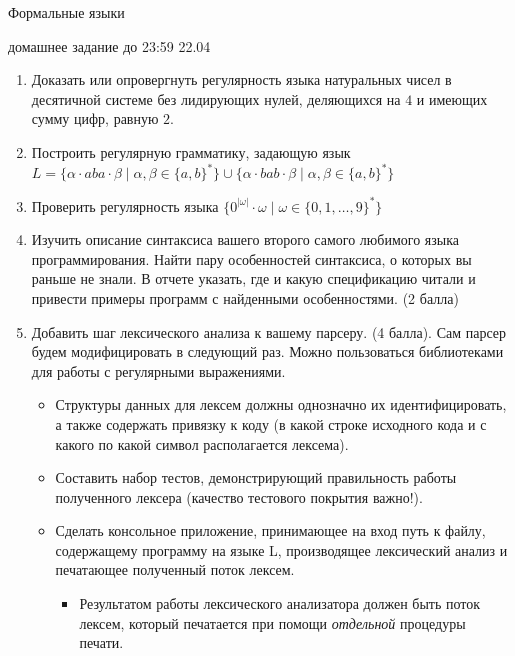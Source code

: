 \documentclass{article}
\begin{document}
\begin{center} {\LARGE Формальные языки} \end{center}

\begin{center} {\Large домашнее задание до 23:59 22.04} \end{center}
\bigskip

\begin{enumerate}
  \item Доказать или опровергнуть регулярность языка натуральных чисел в десятичной системе без лидирующих нулей, деляющихся на $4$ и имеющих сумму цифр, равную $2$.
  \item Построить регулярную грамматику, задающую язык \\ $ L = \{ \alpha \cdot a b a \cdot \beta \mid \alpha, \beta \in \{ a, b \}^* \} \cup \{ \alpha \cdot b a b \cdot \beta \mid \alpha, \beta \in \{ a, b \}^* \} $
  \item Проверить регулярность языка $\{ 0^{|\omega|} \cdot \omega \mid \omega \in \{ 0, 1, \dots, 9 \}^* \} $
  \item Изучить описание синтаксиса вашего второго самого любимого языка программирования. Найти пару особенностей синтаксиса, о которых вы раньше не знали. В отчете указать, где и какую спецификацию читали и привести примеры программ с найденными особенностями. (2 балла)
  \item Добавить шаг лексического анализа к вашему парсеру. (4 балла). Сам парсер будем модифицировать в следующий раз. Можно пользоваться библиотеками для работы с регулярными выражениями. 
    \begin{itemize}
        \item Структуры данных для лексем должны однозначно их идентифицировать, а также содержать привязку к коду (в какой строке исходного кода и с какого по какой символ располагается лексема). 
        \item Составить набор тестов, демонстрирующий правильность работы полученного лексера (качество тестового покрытия важно!).
        \item Сделать консольное  приложение, принимающее на вход путь к файлу, содержащему программу на языке L, производящее лексический анализ и печатающее полученный поток лексем.
        \begin{itemize}
            \item Результатом работы лексического анализатора должен быть поток лексем, который печатается при помощи \emph{отдельной} процедуры печати. 

\end{itemize}
\end{itemize}
\end{enumerate}
\end{document}
